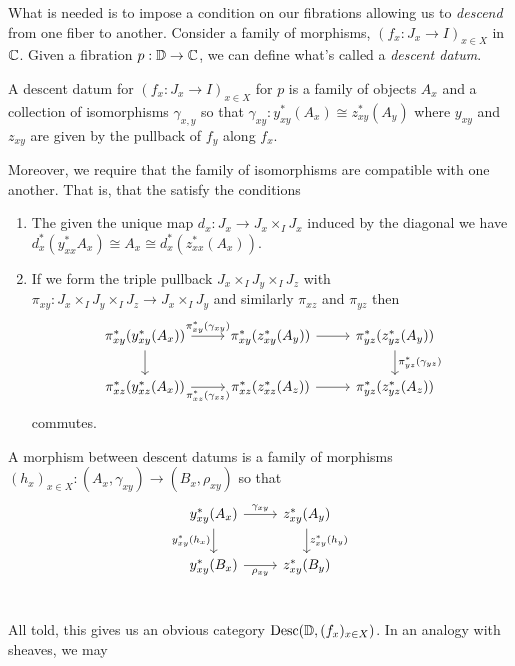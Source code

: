 What is needed is to impose a condition on our fibrations allowing us
to \emph{descend} from one fiber to another. Consider a family of
morphisms, $(f_x : J_x \to I)_{x \in X}$ in $\mathbb{C}$. Given a fibration
$p : \mathbb{D} \to \mathbb{C}$, we can define what's called a \emph{descent
  datum}.
\begin{defn}\label{defn:complete:descentdatum}
  A descent datum for $(f_x : J_x \to I)_{x \in X}$ for $p$ is a
  family of objects $A_x$ and a collection of isomorphisms
  $\gamma_{x, y}$ so that
  $\gamma_{xy} : y_{xy}^*(A_x) \cong z_{xy}^*(A_y)$ where $y_{xy}$ and
  $z_{xy}$ are given by the pullback of $f_y$ along $f_x$.

  Moreover, we require that the family of isomorphisms are compatible
  with one another. That is, that the satisfy the conditions
  \begin{enumerate}
  \item The given the unique map $d_x : J_x \to J_x \times_I J_x$
    induced by the diagonal we have
    $d_x^*(y_{xx}^* A_x) \cong A_x \cong d_x^*(z_{xx}^*(A_x))$.
  \item If we form the triple pullback $J_x \times_I J_y \times_I J_z$
    with $\pi_{xy} : J_x \times_I J_y \times_I J_z \to J_x \times_I J_y$
    and similarly $\pi_{xz}$ and $\pi_{yz}$ then
    \[
      \begin{tikzcd}
        \pi_{xy}^*(y^*_{xy}(A_x)) \ar[d] \ar[r, "\pi_{xy}^*(\gamma_{xy})"] &
        \pi_{xy}^*(z^*_{xy}(A_y)) \ar[r] &
        \pi_{yz}^*(z^*_{yz}(A_y)) \ar[d, "\pi_{yz}^*(\gamma_{yz})"]\\
        \pi_{xz}^*(y^*_{xz}(A_x)) \ar[r, swap, "\pi_{xz}^*(\gamma_{xz})"] &
        \pi_{xz}^*(z^*_{xz}(A_z)) \ar[r] &
        \pi_{yz}^*(z_{yz}^*(A_z))
      \end{tikzcd}
    \]
    commutes.
  \end{enumerate}

  A morphism between descent datums is a family of morphisms
  $(h_x)_{x \in X} : (A_x, \gamma_{xy}) \to (B_x, \rho_{xy})$ so that
  \[
    \begin{tikzcd}
      y_{xy}^*(A_x) \ar[r, "\gamma_{xy}"] \ar[d, swap, "y_{xy}^*(h_x)"] &
      z_{xy}^*(A_y) \ar[d, "z_{xy}^*(h_y)"]\\
      y_{xy}^*(B_x) \ar[r, swap, "\rho_{xy}"] & z_{xy}^*(B_y)\\
    \end{tikzcd}
  \]
\end{defn}
All told, this gives us an obvious category
$\operatorname{Desc}(\mathbb{D}, (f_x)_{x \in X})$. In an analogy with sheaves, we may
